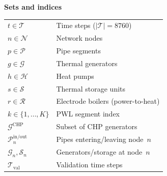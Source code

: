 \documentclass[a4paper,fleqn]{cas-dc}
\begin{document}
\appendix
\newpage
{\footnotesize
\noindent\textbf{Sets and indices}\par\nopagebreak\smallskip
\noindent
\begin{tabular}{@{} >{\raggedright}p{1.5cm} p{5.0cm} @{}}
$t \in \mathcal{T}$                & Time steps ($|\mathcal{T}|=8760$) \\
$n \in \mathcal{N}$                & Network nodes \\
$p \in \mathcal{P}$                & Pipe segments \\
$g \in \mathcal{G}$                & Thermal generators \\
$h \in \mathcal{H}$                & Heat pumps \\
$s \in \mathcal{S}$                & Thermal storage units \\
$r \in \mathcal{R}$                & Electrode boilers (power-to-heat) \\
$k \in \{1,\ldots,K\}$            & PWL segment index \\
$\mathcal{G}^{\mathrm{CHP}}$      & Subset of CHP generators \\
$\mathcal{P}_n^{\mathrm{in/out}}$ & Pipes entering/leaving node~$n$ \\
$\mathcal{G}_n,\mathcal{S}_n$     & Generators/storage at node~$n$ \\
$\mathcal{T}_{\mathrm{val}}$      & Validation time steps \\
\end{tabular}

}
\end{document}
